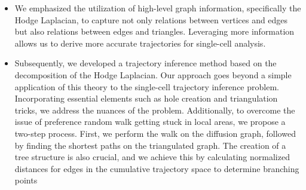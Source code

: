 \begin{itemize}

    \item We emphasized the utilization of high-level graph information, specifically the Hodge Laplacian, to capture not only relations between vertices and edges but also relations between edges and triangles. Leveraging more information allows us to derive more accurate trajectories for single-cell analysis.

    \item Subsequently, we developed a trajectory inference method based on the decomposition of the Hodge Laplacian. Our approach goes beyond a simple application of this theory to the single-cell trajectory inference problem. Incorporating essential elements such as hole creation and triangulation tricks, we address the nuances of the problem. Additionally, to overcome the issue of preference random walk getting stuck in local areas, we propose a two-step process. First, we perform the walk on the diffusion graph, followed by finding the shortest paths on the triangulated graph. The creation of a tree structure is also crucial, and we achieve this by calculating normalized distances for edges in the cumulative trajectory space to determine branching points

\end{itemize}


